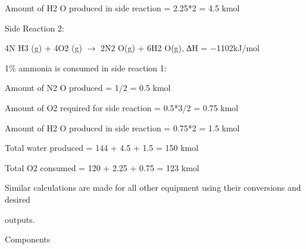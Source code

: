 \documentclass[a4paper,portrait,12pt]{article}
\begin{document}
\begin{flushleft}
Amount of H2 O produced in side reaction = 2.25*2 = 4.5 kmol
\end{flushleft}


\begin{flushleft}
Side Reaction 2:
\end{flushleft}


\begin{flushleft}
4N H3 (g) + 4O2 (g) $\rightarrow$ 2N2 O(g) + 6H2 O(g), ∆H = $-$1102kJ/mol
\end{flushleft}


\begin{flushleft}
1\% ammonia is consumed in side reaction 1:
\end{flushleft}


\begin{flushleft}
Amount of N2 O produced = 1/2 = 0.5 kmol
\end{flushleft}


\begin{flushleft}
Amount of O2 required for side reaction = 0.5*3/2 = 0.75 kmol
\end{flushleft}


\begin{flushleft}
Amount of H2 O produced in side reaction = 0.75*2 = 1.5 kmol
\end{flushleft}


\begin{flushleft}
Total water produced = 144 + 4.5 + 1.5 = 150 kmol
\end{flushleft}


\begin{flushleft}
Total O2 consumed = 120 + 2.25 + 0.75 = 123 kmol
\end{flushleft}


\begin{flushleft}
Similar calculations are made for all other equipment using their conversions and desired
\end{flushleft}


\begin{flushleft}
outputs.
\end{flushleft}





\begin{flushleft}
Components
\end{flushleft}
\end{document}
